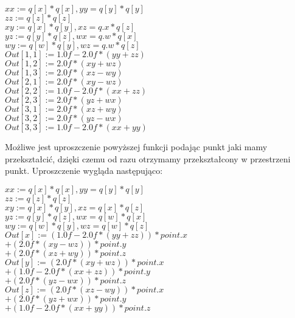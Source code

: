 \begin{centering}
$xx := q[x] * q[x], yy = q[y] * q[y]$\\
$zz := q[z] * q[z]$\\
$xy := q[x] * q[y], xz = q.x * q[z]$\\
$yz := q[y] * q[z], wx = q.w * q[x]$\\
$wy := q[w] * q[y], wz = q.w * q[z]$\\

$Out[1,1] := 1.0f - 2.0f * ( yy + zz )$\\
$Out[1,2] := 2.0f * ( xy + wz )$\\
$Out[1,3] := 2.0f * ( xz - wy )$\\
  
$Out[2,1] := 2.0f * ( xy - wz )$\\
$Out[2,2] := 1.0f - 2.0f * ( xx + zz )$\\
$Out[2,3] := 2.0f * ( yz + wx )$\\
  
$Out[3,1] := 2.0f * ( xz + wy )$\\
$Out[3,2] := 2.0f * ( yz - wx )$\\
$Out[3,3] := 1.0f - 2.0f * ( xx + yy )$\\
\end{centering}
Możliwe jest uproszczenie powyższej funkcji podając punkt jaki mamy przekształcić, dzięki czemu od razu otrzymamy przekształcony w przestrzeni punkt. Uproszczenie wygląda następująco:\\
\begin{centering}
$xx := q[x] * q[x], yy = q[y] * q[y]$\\
$zz := q[z] * q[z]$\\
$xy := q[x] * q[y], xz = q[x] * q[z]$\\
$yz := q[y] * q[z], wx = q[w] * q[x]$\\
$wy := q[w] * q[y], wz = q[w] * q[z]$\\

$Out[x] := (1.0f - 2.0f * ( yy + zz )) * point.x$\\
$+ (2.0f * ( xy - wz )) * point.y $\\
$+ (2.0f * ( xz + wy )) * point.z$\\
$Out[y] := (2.0f * ( xy + wz )) * point.x$\\
$+ (1.0f - 2.0f * ( xx + zz )) * point.y$\\
$+ (2.0f * ( yz - wx )) *point.z$\\
$Out[z] := (2.0f * ( xz - wy )) * point.x$\\
$+ (2.0f * ( yz + wx )) * point.y$\\
$+ (1.0f - 2.0f * ( xx + yy )) * point.z$\\
\end{centering}
